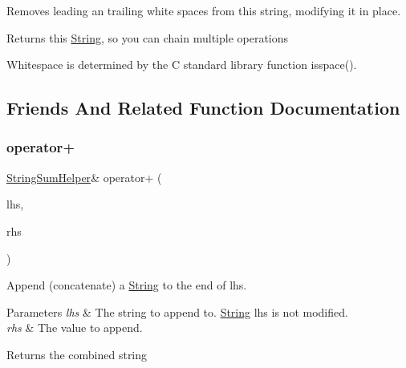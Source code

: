 Removes leading an trailing white spaces from this string, modifying it in place. 

\begin{DoxyReturn}{Returns}
this \hyperlink{class_string}{String}, so you can chain multiple operations
\end{DoxyReturn}
Whitespace is determined by the C standard library function isspace(). 

\subsection{Friends And Related Function Documentation}
\mbox{\label{class_string_a2fb327465c18d4346465237d8a38938c}} 
\subsubsection{\texorpdfstring{operator+}{operator+}\hspace{0.1cm}{\footnotesize\ttfamily [1/10]}}
{\footnotesize\ttfamily \hyperlink{class_string_sum_helper}{String\+Sum\+Helper}\& operator+ (\begin{DoxyParamCaption}\item[{const \hyperlink{class_string_sum_helper}{String\+Sum\+Helper} \&}]{lhs,  }\item[{const \hyperlink{class_string}{String} \&}]{rhs }\end{DoxyParamCaption})\hspace{0.3cm}{\ttfamily [friend]}}



Append (concatenate) a \hyperlink{class_string}{String} to the end of lhs. 


\begin{DoxyParams}{Parameters}
{\em lhs} & The string to append to. \hyperlink{class_string}{String} lhs is not modified.\\
\hline
{\em rhs} & The value to append.\\
\hline
\end{DoxyParams}
\begin{DoxyReturn}{Returns}
the combined string 
\end{DoxyReturn}
\mbox{\label{class_string_aa0fe70fca3cf4c9c3c1e77d2465a9bd9}} 
